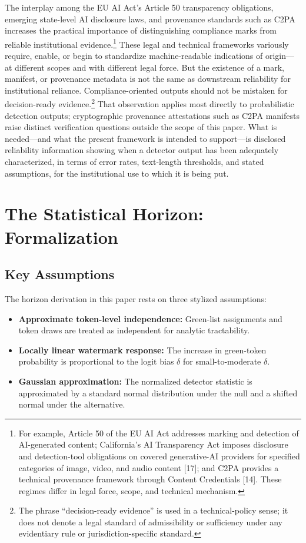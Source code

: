 \documentclass[11pt]{article}
\begin{document}
The interplay among the EU AI Act's Article 50 transparency obligations, emerging
state-level AI disclosure laws, and provenance standards such as C2PA increases
the practical importance of distinguishing compliance marks from reliable
institutional evidence.\footnote{For example, Article 50 of the EU AI Act
addresses marking and detection of AI-generated content; California's AI
Transparency Act imposes disclosure and detection-tool obligations on covered
generative-AI providers for specified categories of image, video, and audio
content [17]; and C2PA provides a technical provenance framework through Content
Credentials [14]. These regimes differ in legal force, scope, and technical
mechanism.} These legal and technical frameworks variously require, enable, or
begin to standardize machine-readable indications of origin---at different scopes
and with different legal force. But the existence of a mark, manifest, or
provenance metadata is not the same as downstream reliability for institutional
reliance. Compliance-oriented outputs should not be mistaken for decision-ready
evidence.\footnote{The phrase ``decision-ready evidence'' is used in a
technical-policy sense; it does not denote a legal standard of admissibility or
sufficiency under any evidentiary rule or jurisdiction-specific standard.} That
observation applies most directly to probabilistic detection outputs;
cryptographic provenance attestations such as C2PA manifests raise distinct
verification questions outside the scope of this paper. What is needed---and what
the present framework is intended to support---is disclosed reliability
information showing when a detector output has been adequately characterized, in
terms of error rates, text-length thresholds, and stated assumptions, for the
institutional use to which it is being put.

\section{The Statistical Horizon: Formalization}

\subsection{Key Assumptions}

The horizon derivation in this paper rests on three stylized assumptions:
\begin{itemize}[leftmargin=2em]
\item \textbf{Approximate token-level independence:} Green-list assignments and
token draws are treated as independent for analytic tractability.
\item \textbf{Locally linear watermark response:} The increase in green-token
probability is proportional to the logit bias $\delta$ for small-to-moderate
$\delta$.
\item \textbf{Gaussian approximation:} The normalized detector statistic is
approximated by a standard normal distribution under the null and a shifted normal
under the alternative.
\end{itemize}
\end{document}
